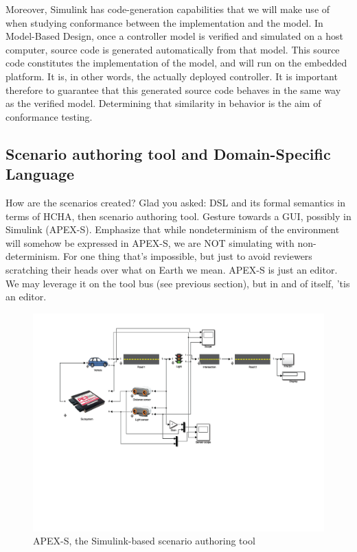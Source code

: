 Moreover, Simulink has code-generation capabilities that we will make use of when studying conformance between the implementation and the model. 
In Model-Based Design, once a controller model is verified and simulated on a host computer, source code is generated automatically from that model. 
This source code constitutes the implementation of the model, and will run on the embedded platform. 
It is, in other words, the actually deployed controller.
It is important therefore to guarantee that this generated source code behaves in the same way as the verified model.
Determining that similarity in behavior is the aim of conformance testing.

 
\subsection{Scenario authoring tool and Domain-Specific Language}
\label{dsl}
How are the scenarios created? 
Glad you asked: DSL and its formal semantics in terms of HCHA, then scenario authoring tool.
Gesture towards a GUI, possibly in Simulink (APEX-S). 
Emphasize that while nondeterminism of the environment will somehow be expressed in APEX-S, we are NOT simulating with non-determinism. For one thing that's impossible, but just to avoid reviewers scratching their heads over what on Earth we mean.
APEX-S is just an editor. We may leverage it on the tool bus (see previous section), but in and of itself, 'tis an editor.
\begin{figure}[tb]
	\centering
		\includegraphics[scale=0.3]{figures/APEXS.pdf}
	\caption{APEX-S, the Simulink-based scenario authoring tool}
	\label{fig:APEXS}
\end{figure}
